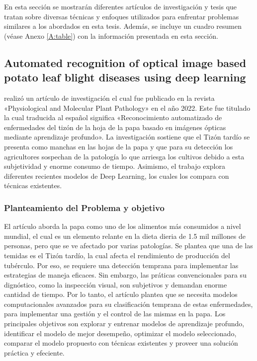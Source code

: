 En esta sección se mostrarán diferentes artículos de investigación y tesis que tratan sobre diversas técnicas y enfoques utilizados para enfrentar problemas similares a los abordados en esta tesis. Además, se incluye un cuadro resumen (véase Anexo \ref{A:table}) con la información presentada en esta sección.


\subsection{Automated recognition of optical image based potato leaf blight diseases using deep learning \citep*{CHAKRABORTY2022101781}}

\citeauthor{CHAKRABORTY2022101781} realizó un artículo de investigación el cual fue publicado en la revista «Physiological and Molecular Plant Pathology» en el año 2022. 
Este fue titulado  la cual traducida al español significa «Reconocimiento automatizado de enfermedades del tizón de la hoja de la papa basado en imágenes ópticas mediante aprendizaje profundo». La investigación sostiene que el Tizón tardío se presenta como manchas en las hojas de la papa y que para su detección los agricultores sospechan de la patología lo que arriesga los cultivos debido a esta subjetividad y enorme consumo de tiempo. Asimismo, el trabajo explora diferentes recientes modelos de Deep Learning, los cuales los compara con técnicas existentes. 

\subsubsection{Planteamiento del Problema y objetivo }
El artículo aborda la papa como uno de los alimentos más consumidos a nivel mundial, el cual es un elemento relante en la dieta dieria de 1.5 mil millones de personas, pero que se ve afectado por varias patologías. Se plantea que una de las temidas es el Tizón tardío, la cual afecta el rendimiento de producción del tubérculo. Por eso, se requiere una detección temprana para implementar las estrategias de maneja eficaces. Sin embargo, las práticas convencionales para su dignóstico, como la inspección visual, son subjetivos y demandan enorme cantidad de tiempo. Por lo tanto, el artículo plantea que se necesita modelos computacionales avanzados para su clasificación temprana de estas enfermedades, para implementar una gestión y el control de las mismas en la papa. Los principales objetivos son explorar y entrenar modelos de aprendizaje profundo, identificar el modelo de mejor desempeño, optimizar el modelo seleccionado, comparar el modelo propuesto con técnicas existentes y proveer una solución práctica y efeciente.

